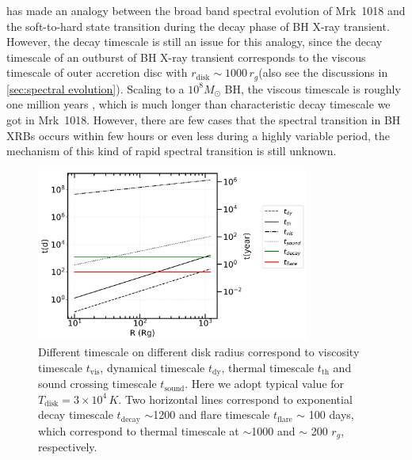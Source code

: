 \documentclass[twocolumn]{aastex63}
\begin{document}
\citet{2018MNRAS.480.3898N} has made an analogy between the broad band spectral evolution of Mrk~1018 and the soft-to-hard state transition during the decay phase of BH X-ray transient. However, the decay timescale is still an issue for this analogy, since the decay timescale of an outburst of BH X-ray transient corresponds to the viscous timescale of outer accretion disc with $r_\mathrm{disk}\sim 1000\, r_g$(also see the discussions in \autoref{sec:spectral evolution}). Scaling to a $10^{8}M_{\odot}$ BH, the viscous timescale is roughly one million years \citep{2012MmSAI..83..469L,2018MNRAS.475.1190Y}, which is much longer than characteristic decay timescale we got in Mrk~1018. However, there are few cases that the spectral transition in BH XRBs occurs within few hours or even less \citep{2011A&A...533A...8B,2020A&A...634A..94K} during a highly variable period, the mechanism of this kind of rapid spectral transition is still unknown. 

\begin{figure}
\centering
	\includegraphics[width=0.8\textwidth]{./pic/Mrk1018_timescale.png}
    \caption{Different timescale on different disk radius correspond to viscosity timescale $t_\mathrm{vis}$, dynamical timescale $t_\mathrm{dy}$, thermal timescale $t_\mathrm{th}$ and sound crossing timescale $t_\mathrm{sound}$. Here we adopt typical value for $T_\mathrm{disk}=3\times10^4\, K$. Two horizontal lines correspond to exponential decay timescale $t_\mathrm{decay}$ $\sim$1200 and flare timescale $t_\mathrm{flare}$ $\sim$ 100 days, which correspond to thermal timescale at $\sim$1000 and $\sim$ 200 $r_g$, respectively.}
    \label{fig:timescale}
\end{figure}
\end{document}
